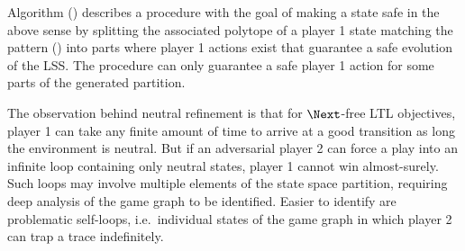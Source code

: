     Algorithm () describes a procedure with the goal of making a state safe in the above sense by splitting the associated polytope of a player 1 state matching the pattern () into parts where player 1 actions exist that guarantee a safe evolution of the LSS.
    The procedure can only guarantee a safe player 1 action for some parts of the generated partition. %

\stopsubsection


    \startalgorithmic[numbering=no,margin=0em]
    \stopalgorithmic
    \startalgorithmic
                \ENDIF
            \ENDIF
        \ENDFOR
    \stopalgorithmic
\stopbuffer

\startsubsection[title={Loop Removal},reference={sec:refinement-holistic-loops}]


    The observation behind neutral refinement is that for $\Next$-free LTL objectives, player 1 can take any finite amount of time to arrive at a good transition as long the environment is neutral.
    But if an adversarial player 2 can force a play into an infinite loop containing only neutral states, player 1 cannot win almost-surely.
    Such loops may involve multiple elements of the state space partition, requiring deep analysis of the game graph to be identified.
    Easier to identify are problematic self-loops, i.e.\ individual states of the game graph in which player 2 can trap a trace indefinitely.

